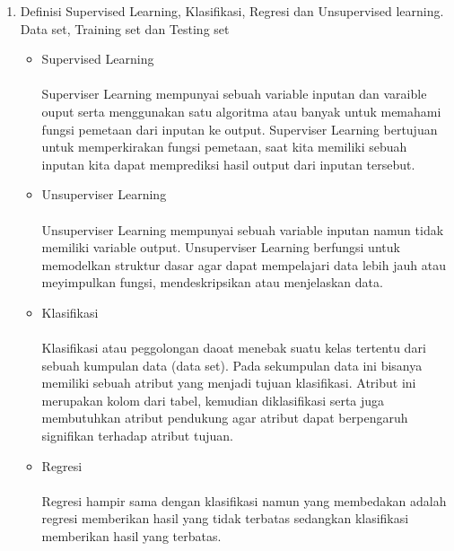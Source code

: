 \documentclass{article}
\begin{document}
\begin{enumerate}
            \item Definisi Supervised Learning, Klasifikasi, Regresi dan Unsupervised learning. Data set, Training set dan Testing set
                \begin{itemize}
                    \item Supervised Learning
                        \paragraph{}Superviser Learning mempunyai sebuah variable inputan dan varaible ouput serta menggunakan satu algoritma atau banyak untuk memahami fungsi pemetaan dari inputan ke output. Superviser Learning bertujuan untuk memperkirakan fungsi pemetaan, saat kita memiliki sebuah inputan kita dapat memprediksi hasil output dari inputan tersebut.
                    \item Unsuperviser Learning
                        \paragraph{}Unsuperviser Learning mempunyai sebuah variable inputan namun tidak memiliki variable output. Unsuperviser Learning berfungsi untuk memodelkan struktur dasar agar dapat mempelajari data lebih jauh atau meyimpulkan fungsi, mendeskripsikan atau menjelaskan data.
                    \item Klasifikasi
                        \paragraph{}Klasifikasi atau peggolongan daoat menebak suatu kelas tertentu dari sebuah kumpulan data (data set). Pada sekumpulan data ini bisanya memiliki sebuah atribut yang menjadi tujuan klasifikasi. Atribut ini merupakan kolom dari tabel, kemudian diklasifikasi serta juga membutuhkan atribut pendukung agar atribut dapat berpengaruh signifikan terhadap atribut tujuan.
                    \item Regresi
                        \paragraph{}Regresi hampir sama dengan klasifikasi namun yang membedakan adalah regresi memberikan hasil yang tidak terbatas sedangkan klasifikasi memberikan hasil yang terbatas.
                \end{itemize}
        \end{enumerate}
        
\end{document}
